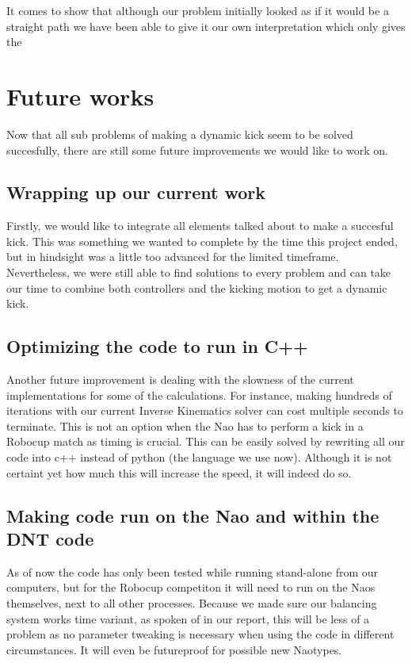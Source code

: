 \documentclass[a4paper]{article}
\begin{document}
It comes to show that although our problem initially looked as if it would be a
straight path we have been able to give it our own interpretation which only
gives the 

\section{Future works}
Now that all sub problems of making a dynamic kick seem to be solved succesfully, there are still some future improvements we would like to work on.

\subsection{Wrapping up our current work}
Firstly, we would like to integrate all elements talked about to make a succesful kick. This
was something we wanted to complete by the time this project ended, but in
hindsight was a little too advanced for the limited
timeframe. Nevertheless, we were still  able to find
solutions to every problem and can take our time to combine both controllers
and the kicking motion to get a dynamic kick.

\subsection{Optimizing the code to run in C++}
Another future improvement is dealing with the slowness of the current
implementations for some of the calculations. For instance, making hundreds of 
iterations with our current Inverse Kinematics solver can cost multiple
seconds to terminate.
This is not an option when the Nao has to perform a kick in a Robocup match
as timing is crucial. This
can be easily solved by rewriting all our code into c++ instead of python (the
language we use now). Although it is not certaint yet how much this will
increase the speed, it will indeed do so.

\subsection{Making code run on the Nao and within the DNT code} 
As of now the code has only been tested while running stand-alone from our computers, but
for the Robocup competiton it will need to run on the Naos themselves, next to all
other processes. Because we
made sure our balancing system works time variant, as spoken of in our report, this
will be less of a problem as no parameter tweaking is necessary when using the
code in different circumstances. It will even be futureproof for possible new
Naotypes.
\end{document}
